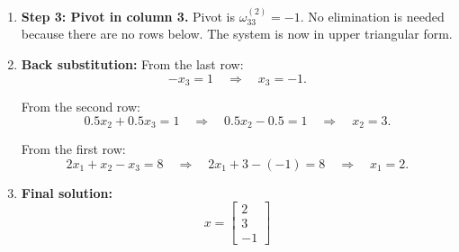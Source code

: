 \documentclass[../../../main.tex]{subfiles}
\begin{document}
\begin{enumerate}
    \item \textbf{Step 3: Pivot in column 3.}
          Pivot is $\omega_{33}^{(2)} = -1$. No elimination is needed because there are no rows below.
          The system is now in upper triangular form.
    \item \textbf{Back substitution:}
          From the last row:
          \begin{equation*}
              - x_3 = 1 \quad \Rightarrow \quad x_3 = -1.
          \end{equation*}

          From the second row:
          \begin{equation*}
              0.5x_2 + 0.5x_3 = 1 \quad \Rightarrow \quad 0.5x_2 - 0.5 = 1 \quad \Rightarrow \quad x_2 = 3.
          \end{equation*}

          From the first row:
          \begin{equation*}
              2x_1 + x_2 - x_3 = 8 \quad \Rightarrow \quad 2x_1 + 3 - (-1) = 8 \quad \Rightarrow \quad x_1 = 2.
          \end{equation*}
    \item \textbf{Final solution:}
          \begin{equation*}
              x =
              \begin{bmatrix}
                  2 \\ 3 \\ -1
              \end{bmatrix}
          \end{equation*}
\end{enumerate}
\end{document}
